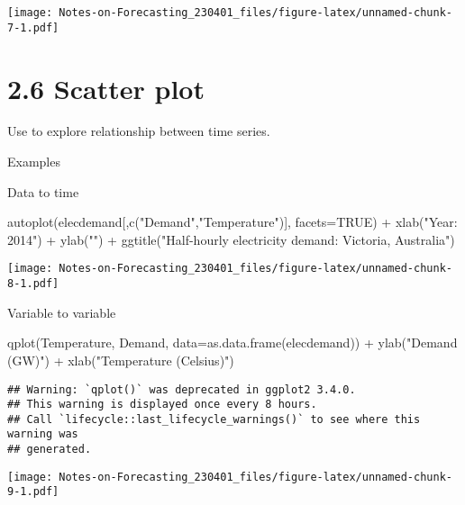 \documentclass[
]{article}
\newenvironment{Shaded}{\begin{snugshade}}{\end{snugshade}}
\newcommand{\AttributeTok}[1]{\textcolor[rgb]{0.77,0.63,0.00}{#1}}
\newcommand{\ConstantTok}[1]{\textcolor[rgb]{0.00,0.00,0.00}{#1}}
\newcommand{\FunctionTok}[1]{\textcolor[rgb]{0.00,0.00,0.00}{#1}}
\newcommand{\NormalTok}[1]{#1}
\newcommand{\SpecialCharTok}[1]{\textcolor[rgb]{0.00,0.00,0.00}{#1}}
\newcommand{\StringTok}[1]{\textcolor[rgb]{0.31,0.60,0.02}{#1}}
\begin{document}
\texttt{[image: Notes-on-Forecasting\_230401\_files/figure-latex/unnamed-chunk-7-1.pdf]}

\hypertarget{scatter-plot}{%
\section{2.6 Scatter plot}\label{scatter-plot}}

Use to explore relationship between time series.

Examples

Data to time

\begin{Shaded}
\begin{Highlighting}[]
\FunctionTok{autoplot}\NormalTok{(elecdemand[,}\FunctionTok{c}\NormalTok{(}\StringTok{"Demand"}\NormalTok{,}\StringTok{"Temperature"}\NormalTok{)], }\AttributeTok{facets=}\ConstantTok{TRUE}\NormalTok{) }\SpecialCharTok{+}
  \FunctionTok{xlab}\NormalTok{(}\StringTok{"Year: 2014"}\NormalTok{) }\SpecialCharTok{+} \FunctionTok{ylab}\NormalTok{(}\StringTok{""}\NormalTok{) }\SpecialCharTok{+}
  \FunctionTok{ggtitle}\NormalTok{(}\StringTok{"Half{-}hourly electricity demand: Victoria, Australia"}\NormalTok{)}
\end{Highlighting}
\end{Shaded}

\texttt{[image: Notes-on-Forecasting\_230401\_files/figure-latex/unnamed-chunk-8-1.pdf]}

Variable to variable

\begin{Shaded}
\begin{Highlighting}[]
\FunctionTok{qplot}\NormalTok{(Temperature, Demand, }\AttributeTok{data=}\FunctionTok{as.data.frame}\NormalTok{(elecdemand)) }\SpecialCharTok{+}
  \FunctionTok{ylab}\NormalTok{(}\StringTok{"Demand (GW)"}\NormalTok{) }\SpecialCharTok{+} \FunctionTok{xlab}\NormalTok{(}\StringTok{"Temperature (Celsius)"}\NormalTok{)}
\end{Highlighting}
\end{Shaded}

\begin{verbatim}
## Warning: `qplot()` was deprecated in ggplot2 3.4.0.
## This warning is displayed once every 8 hours.
## Call `lifecycle::last_lifecycle_warnings()` to see where this warning was
## generated.
\end{verbatim}

\texttt{[image: Notes-on-Forecasting\_230401\_files/figure-latex/unnamed-chunk-9-1.pdf]}
\end{document}
